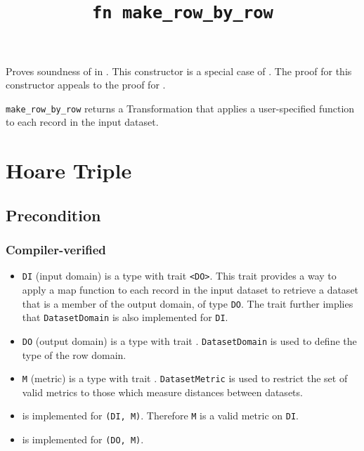 \documentclass{article}
\title{\texttt{fn make\_row\_by\_row}}
\author{\MichaelShoemateAuthor}
\date{}
\begin{document}
\maketitle
\contrib
Proves soundness of  in .
This constructor is a special case of .
The proof for this constructor appeals to the proof for .

\texttt{make\_row\_by\_row} returns a Transformation that applies a user-specified function to each record in the input dataset.

\section{Hoare Triple}
\subsection*{Precondition}
\subsubsection*{Compiler-verified}
\begin{itemize}
    \item \texttt{DI} (input domain) is a type with trait \texttt{<DO>}.
        This trait provides a way to apply a map function to each record in the input dataset to retrieve a dataset that is a member of the output domain, of type \texttt{DO}. The trait further implies that \texttt{DatasetDomain} is also implemented for \texttt{DI}.
    \item \texttt{DO} (output domain) is a type with trait .
        \texttt{DatasetDomain} is used to define the type of the row domain.
    \item \texttt{M} (metric) is a type with trait .
        \texttt{DatasetMetric} is used to restrict the set of valid metrics to those which measure distances between datasets.
    \item {} is implemented for \texttt{(DI, M)}. Therefore \texttt{M} is a valid metric on \texttt{DI}.
    \item {} is implemented for \texttt{(DO, M)}.
\end{itemize}
\end{document}
